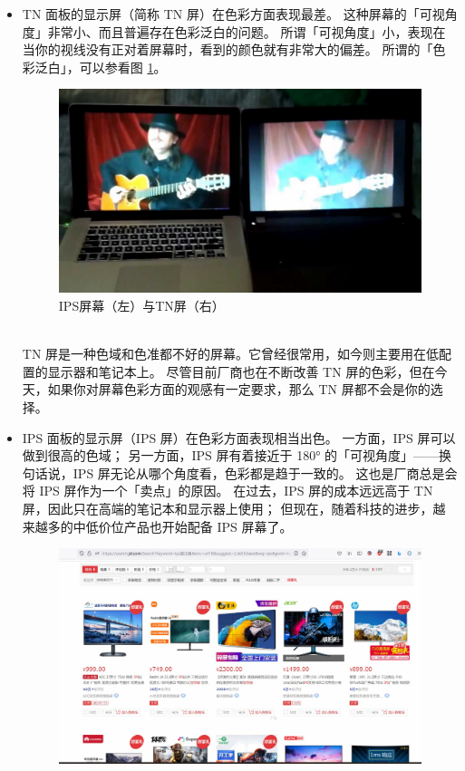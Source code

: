 \begin{itemize}
  \item TN 面板的显示屏（简称 TN 屏）在色彩方面表现最差。
    这种屏幕的「可视角度」非常小、而且普遍存在色彩泛白的问题。
    所谓「可视角度」小，表现在当你的视线没有正对着屏幕时，看到的颜色就有非常大的偏差。
    所谓的「色彩泛白」，可以参看图 \ref{IPS_vs_TN}。
    \begin{figure}[htb!]
      \centering
      \includegraphics[width=11cm]{assets/IPS_vs_TN.jpg}
      \caption{IPS屏幕（左）与TN屏（右）}
      \label{IPS_vs_TN}
    \end{figure}\\
    TN 屏是一种色域和色准都不好的屏幕。它曾经很常用，如今则主要用在低配置的显示器和笔记本上。
    尽管目前厂商也在不断改善 TN 屏的色彩，但在今天，如果你对屏幕色彩方面的观感有一定要求，那么 TN 屏都不会是你的选择。
  \item IPS 面板的显示屏（IPS 屏）在色彩方面表现相当出色。
    一方面，IPS 屏可以做到很高的色域；
    另一方面，IPS 屏有着接近于 180° 的「可视角度」——换句话说，IPS 屏无论从哪个角度看，色彩都是趋于一致的。
    这也是厂商总是会将 IPS 屏作为一个「卖点」的原因。
    在过去，IPS 屏的成本远远高于 TN 屏，因此只在高端的笔记本和显示器上使用；
    但现在，随着科技的进步，越来越多的中低价位产品也开始配备 IPS 屏幕了。
    \begin{figure}[htb!]
      \centering
      \includegraphics[width=13cm]{assets/IPS_at_Low_Price.jpg}

\end{figure}
\end{itemize}
